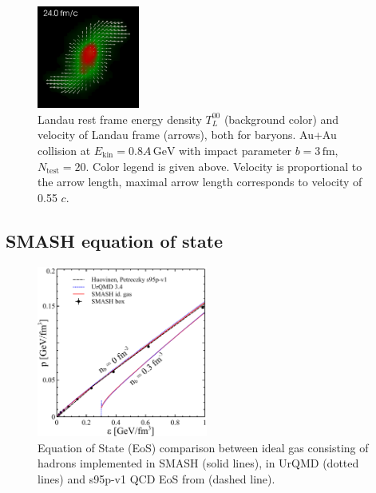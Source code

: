\begin{figure}
  \includegraphics[width=0.3\textwidth]{plots/smash/thermodynamics/AuAu_EKin08GeV_b3_Ntest20/AuAu_EKin08_b3_5.png}
  \caption{ Landau rest frame energy density $T^{00}_L$ (background color) and
           velocity of Landau frame (arrows), both for baryons. Au+Au collision at
           $E_\text{kin} = 0.8A\,\text{GeV}$ with impact parameter $b = 3\,\text{fm}$,
           $N_\text{test} = 20$. Color legend is given above. Velocity is proportional
           to
           the arrow length, maximal arrow length corresponds to velocity of 0.55 $c$.  }
  \label{fig:landau_e_v}
\end{figure}



\subsection{SMASH equation of state} \label{sec:smash_eos}

\begin{figure}
  \centering
  \includegraphics[width=0.5\textwidth]{plots/forced_thermalization/eos.pdf}
  \caption{Equation of State (EoS) comparison between ideal gas consisting of
           hadrons implemented in SMASH (solid lines), in UrQMD (dotted lines) and 
           s95p-v1 QCD EoS from \cite{Huovinen:2009yb} (dashed line).}
  \label{FIG:I}
\end{figure}

